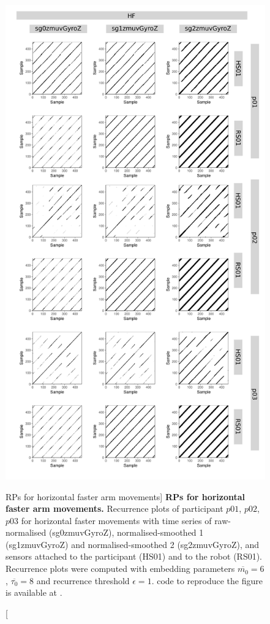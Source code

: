 \begin{figure}
\centering
\includegraphics[height=0.80\textheight]{rp_HF}
\caption
	[RPs for horizontal faster arm movements]{
	{\bf RPs for horizontal faster arm movements.}	
	Recurrence plots %
	of participant $p01$, $p02$, $p03$ for horizontal faster
	movements with time series of raw-normalised (sg0zmuvGyroZ), 
	normalised-smoothed 1 (sg1zmuvGyroZ) and 
	normalised-smoothed 2 (sg2zmuvGyroZ), and 
	sensors attached to the participant (HS01) and to the robot (RS01).
	Recurrence plots were computed with 
	embedding parameters $\overline{m_0}=6$, $\overline{\tau_0}=8$ and
	recurrence threshold $\epsilon=1$.
	\R code to reproduce the figure is available at 
	.
        }
    \label{fig:rp_HF}
\end{figure}
